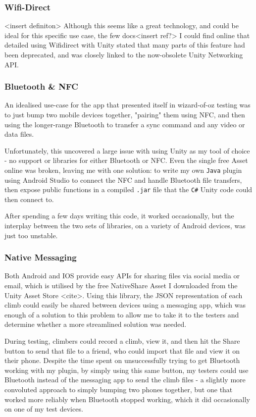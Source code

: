\subsubsection{Wifi-Direct}
<insert definiton>
Although this seems like a great technology, and could be ideal for this specific use case, the few docs<insert ref?> I could find online that detailed using Wifidirect with Unity stated that many parts of this feature had been deprecated, and was closely linked to the now-obsolete Unity Networking API.


\subsubsection{Bluetooth & NFC}
An idealised use-case for the app that presented itself in wizard-of-oz testing was to just bump two mobile devices together, "pairing" them using NFC, and then using the longer-range Bluetooth to transfer a sync command and any video or data files.

Unfortunately, this uncovered a large issue with using Unity as my tool of choice - no support or libraries for either Bluetooth or NFC. 
Even the single free Asset online was broken, leaving me with one solution: to write my own \verb|Java| plugin using Android Studio to connect the NFC and handle Bluetooth file transfers, then expose public functions in a compiled \verb|.jar| file that the \verb|C#| Unity code could then connect to.

After spending a few days writing this code, it worked occasionally, but the interplay between the two sets of libraries, on a variety of Android devices, was just too unstable.

\subsubsection{Native Messaging}
Both Android and IOS provide easy APIs for sharing files via social media or email, which is utilised by the free NativeShare Asset I downloaded from the Unity Asset Store <cite>.
Using this library, the JSON representation of each climb could easily be shared between devices using a messaging app, which was enough of a solution to this problem to allow me to take it to the testers and determine whether a more streamlined solution was needed.

During testing, climbers could record a climb, view it, and then hit the Share button to send that file to a friend, who could import that file and view it on their phone.
Despite the time spent on unsuccessfully trying to get Bluetooth working with my plugin, by simply using this same button, my testers could use Bluetooth instead of the messaging app to send the climb files - a slightly more convoluted approach to simply bumping two phones together, but one that worked more reliably when Bluetooth stopped working, which it did occasionally on one of my test devices.



